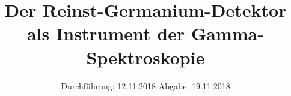 

\subject{VERSUCH NUMMER 18}
\title{Der Reinst-Germanium-Detektor als Instrument der Gamma-Spektroskopie}
\date{
  Durchführung: 12.11.2018
  \hspace{3em}
  Abgabe: 19.11.2018
}



\thispagestyle{empty}
\maketitle
\thispagestyle{empty}
\tableofcontents
\newpage
\setcounter{page}{1}


% 




\nocite{*}
\printbibliography


